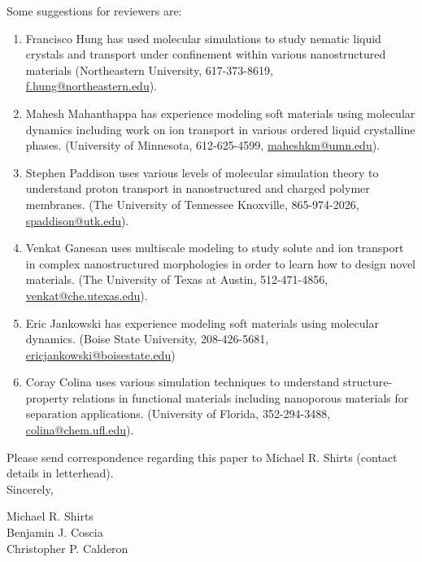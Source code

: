 \documentclass[fontsize=11pt]{article}
\begin{document}
	\noindent Some suggestions for reviewers are:
	\begin{enumerate}
	
		\item Francisco Hung has used molecular simulations to study nematic liquid crystals
		and transport under confinement within various nanostructured materials 
		(Northeastern University, 617-373-8619,\\ \href{mailto:f.hung@northeastern.edu}{f.hung@northeastern.edu}).
		
		\item Mahesh Mahanthappa has experience modeling soft materials using molecular dynamics
		including work on ion transport in various ordered liquid crystalline phases. 
		(University of Minnesota, 612-625-4599, \href{mailto:maheshkm@umn.edu}{maheshkm@umn.edu}).
		
		\item Stephen Paddison uses various levels of molecular simulation theory to understand
		proton transport in nanostructured and charged polymer membranes. (The University of Tennessee 
		Knoxville, 865-974-2026, \href{mailto:spaddison@utk.edu}{spaddison@utk.edu}).
		
		\item Venkat Ganesan uses multiscale modeling to study solute and ion transport in complex
		nanostructured morphologies in order to learn how to design novel materials. (The University
		of Texas at Austin, 512-471-4856, \href{mailto:venkat@che.utexas.edu}{venkat@che.utexas.edu}).
		
		\item Eric Jankowski has experience modeling soft materials using molecular dynamics.
		(Boise State University, 208-426-5681, \href{mailto:ericjankowski@boisestate.edu}{ericjankowski@boisestate.edu})
		
		\item Coray Colina uses various simulation techniques to understand structure-property relations
		in functional materials including nanoporous materials for separation applications. (University
		of Florida, 352-294-3488, \href{mailto:colina@chem.ufl.edu}{colina@chem.ufl.edu}).
		
%		
%		
	\end{enumerate}
	
	\noindent Please send correspondence regarding this paper to Michael R. Shirts (contact
	details in letterhead).\\	
	
	\noindent Sincerely,
	
	\noindent Michael R. Shirts \\
	\noindent Benjamin J. Coscia \\
	\noindent Christopher P. Calderon \\
	
\end{document}
